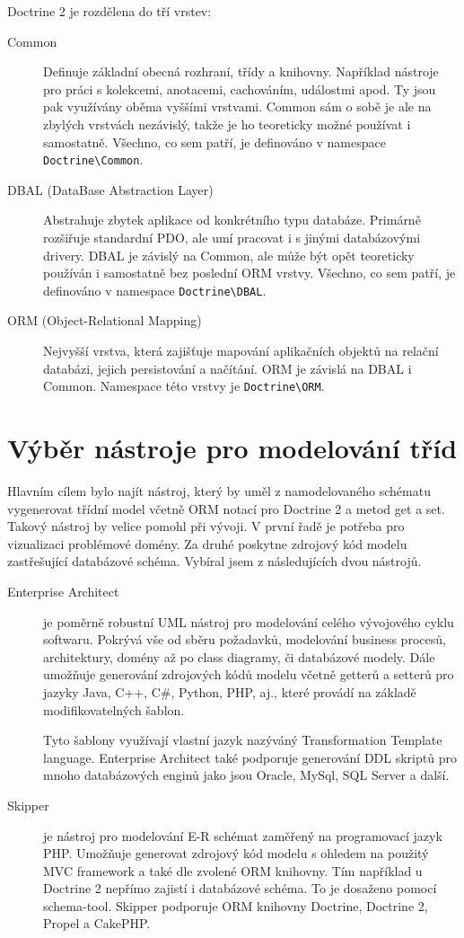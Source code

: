 \documentclass[thesis=B,czech]{FITthesis}[2012/06/26]
\begin{document}
	Doctrine 2 je rozdělena do tří vrstev:
	\begin{description}
		\item[Common] Definuje základní obecná rozhraní, třídy a knihovny. Například nástroje pro práci s kolekcemi, anotacemi, cachováním, událostmi apod. Ty jsou pak využívány oběma vyššími vrstvami. Common sám o sobě je ale na zbylých vrstvách nezávislý, takže je ho teoreticky možné používat i samostatně. Všechno, co sem patří, je definováno v namespace \verb|Doctrine\Common|.
		\item[DBAL (DataBase Abstraction Layer)] Abstrahuje zbytek aplikace od konkrétního typu databáze. Primárně rozšiřuje standardní PDO, ale umí pracovat i s jinými databázovými drivery. DBAL je závislý na Common, ale může být opět teoreticky používán i samostatně bez poslední ORM vrstvy. Všechno, co sem patří, je definováno v namespace \verb|Doctrine\DBAL|.
		\item[ORM (Object-Relational Mapping)] Nejvyšší vrstva, která zajišťuje mapování aplikačních objektů na relační databázi, jejich persistování a načítání. ORM je závislá na DBAL i Common. Namespace této vrstvy je \verb|Doctrine\ORM|.\cite{doctrine2}
	\end{description}

\section{Výběr nástroje pro modelování tříd}
	Hlavním cílem bylo najít nástroj, který by uměl z namodelovaného schématu vygenerovat třídní model včetně ORM notací pro Doctrine 2 a metod get a set. Takový nástroj by velice pomohl při vývoji. V první řadě je potřeba pro vizualizaci problémové domény. Za druhé poskytne zdrojový kód modelu zastřešující databázové schéma. Vybíral jsem z následujících dvou nástrojů.

\begin{description}
	\item[Enterprise Architect\cite{enterprise_architect}]
	je poměrně robustní UML nástroj pro modelování celého vývojového cyklu softwaru. Pokrývá vše od sběru požadavků, modelování business procesů, architektury, domény až po class diagramy, či databázové modely. Dále umožňuje generování zdrojových kódů modelu včetně getterů a setterů pro jazyky Java, C++, C\#, Python, PHP, aj., které provádí na základě modifikovatelných šablon. 
	
	Tyto šablony využívají vlastní jazyk nazýváný Transformation Template language. Enterprise Architect také podporuje generování DDL skriptů pro mnoho databázových enginů jako jsou Oracle, MySql, SQL Server a další.\cite{enterprise_architect}

	\item[Skipper\cite{skipper}]
	je nástroj pro modelování E-R schémat zaměřený na programovací jazyk PHP. Umožňuje generovat zdrojový kód modelu s ohledem na použitý MVC framework a také dle zvolené ORM knihovny. Tím například u Doctrine 2 nepřímo zajistí i databázové schéma. To je dosaženo pomocí schema-tool. Skipper podporuje ORM knihovny Doctrine, Doctrine 2, Propel a CakePHP.\cite{skipper_features}
\end{description}
\end{document}
